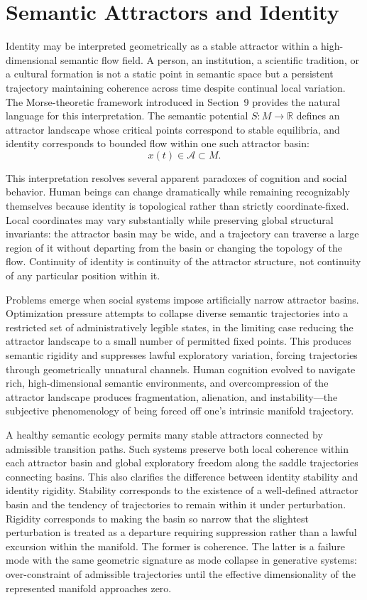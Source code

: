 \documentclass[11pt,a4paper,twocolumn]{article}
\begin{document}
\section{Semantic Attractors and Identity}

Identity may be interpreted geometrically as a stable
attractor within a high-dimensional semantic flow field.
A person, an institution, a scientific tradition, or a
cultural formation is not a static point in semantic space
but a persistent trajectory maintaining coherence across
time despite continual local variation. The Morse-theoretic
framework introduced in Section~9 provides the natural
language for this interpretation. The semantic potential
$S : M \to \mathbb{R}$ defines an attractor landscape
whose critical points correspond to stable equilibria,
and identity corresponds to bounded flow within one such
attractor basin:
\[
x(t) \in \mathcal{A} \subset M.
\]

This interpretation resolves several apparent paradoxes
of cognition and social behavior. Human beings can change
dramatically while remaining recognizably themselves
because identity is topological rather than strictly
coordinate-fixed. Local coordinates may vary substantially
while preserving global structural invariants: the
attractor basin may be wide, and a trajectory can traverse
a large region of it without departing from the basin or
changing the topology of the flow. Continuity of identity
is continuity of the attractor structure, not continuity
of any particular position within it.

Problems emerge when social systems impose artificially
narrow attractor basins. Optimization pressure attempts to
collapse diverse semantic trajectories into a restricted
set of administratively legible states, in the limiting
case reducing the attractor landscape to a small number
of permitted fixed points. This produces semantic rigidity
and suppresses lawful exploratory variation, forcing
trajectories through geometrically unnatural channels.
Human cognition evolved to navigate rich, high-dimensional
semantic environments, and overcompression of the attractor
landscape produces fragmentation, alienation, and
instability---the subjective phenomenology of being forced
off one's intrinsic manifold trajectory.

A healthy semantic ecology permits many stable attractors
connected by admissible transition paths. Such systems
preserve both local coherence within each attractor basin
and global exploratory freedom along the saddle trajectories
connecting basins. This also clarifies the difference
between identity stability and identity rigidity. Stability
corresponds to the existence of a well-defined attractor
basin and the tendency of trajectories to remain within
it under perturbation. Rigidity corresponds to making
the basin so narrow that the slightest perturbation is
treated as a departure requiring suppression rather than
a lawful excursion within the manifold. The former is
coherence. The latter is a failure mode with the same
geometric signature as mode collapse in generative systems:
over-constraint of admissible trajectories until the
effective dimensionality of the represented manifold
approaches zero.
\end{document}
